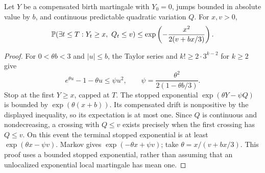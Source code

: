 \begin{lemma}\label{lem:exp}
Let \(Y\) be a compensated birth martingale with \(Y_0=0\), jumps
bounded in absolute value by \(b\), and continuous predictable
quadratic variation \(Q\). For \(x,v>0\),
\begin{equation}\label{eq:freedman}
 \mathbb P(\exists t\le T:Y_t\ge x,\ Q_t\le v)
 \le\exp\left(-\frac{x^2}{2(v+bx/3)}\right).
\end{equation}
\end{lemma}
\begin{proof}
For \(0<\theta b<3\) and \(|u|\le b\), the Taylor series and
\(k!\ge2\cdot3^{k-2}\) for \(k\ge2\) give
\[
 e^{\theta u}-1-\theta u
 \le\psi u^2,\qquad \psi=\frac{\theta^2}{2(1-\theta b/3)}.
\]
Stop at the first \(Y\ge x\), capped at \(T\). The stopped
exponential \(\exp(\theta Y-\psi Q)\) is bounded by
\(\exp(\theta(x+b))\). Its compensated drift is nonpositive by the
displayed inequality, so its expectation is at most one.
Since \(Q\) is continuous and nondecreasing, a crossing with
\(Q\le v\) exists precisely when the first crossing has \(Q\le v\).
On this event the terminal stopped exponential is at least
\(\exp(\theta x-\psi v)\). Markov gives
\(\exp(-\theta x+\psi v)\); take \(\theta=x/(v+bx/3)\).
This proof uses a bounded stopped exponential, rather than assuming
that an unlocalized exponential local martingale has mean one.
\end{proof}


